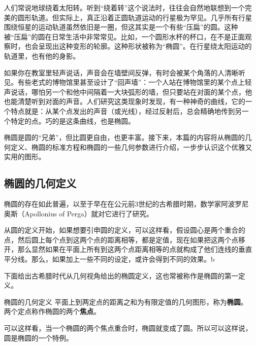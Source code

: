 
\begin{issues}
\issueDraft
\end{issues}


人们常说地球绕着太阳转。听到“绕着转”这个说法时，往往会自然地联想到一个完美的圆形轨道。但实际上，真正沿着正圆轨道运动的行星极为罕见。几乎所有行星围绕恒星的运动轨道虽然依旧是一圈，但这其实是一个有些“压扁”的圆。这种被“压扁”的圆在日常生活中非常常见。比如，一个圆形水杯的杯口，在不是正面观察时，也会呈现出这种变形的轮廓。这种形状被称为“椭圆”。在行星绕太阳运动的轨道里，也有他的身影。

如果你在教室里轻声说话，声音会在墙壁间反弹，有时会被某个角落的人清晰听见。有些老式的博物馆里甚至设计了“回声墙”：一个人站在博物馆里的某个点上轻声说话，哪怕另一个和他中间隔着一大块弧形的墙，但只要站在对面的某个点，他也能清楚听到对面的声音。人们研究这类现象时发现，有一种神奇的曲线，它的一个特点就是：从某个点发出的声音（或光线），经过反射后，总会精确地传到另一个特定的点。巧的是这条曲线，也是椭圆。

椭圆是圆的“兄弟”，但比圆更自由，也更丰富。接下来，本篇的内容将从椭圆的几何定义、椭圆的标准方程和椭圆的一些几何参数进行介绍，一步步认识这个优雅又实用的图形。

\subsection{椭圆的几何定义}

椭圆的存在如此普遍，以至于早在在公元前3世纪的古希腊时期，数学家阿波罗尼奥斯（Apollonius of Perga）就对它进行了研究。

从圆的定义开始，如果想要引申圆的定义，可以这样看，假设圆心是两个重合的点，然后圆上每个点到这两个点的距离相等，都是定值，现在如果把这两个点移开，那么显然如果在平面上所有到这两个点距离相等的点就构成了他们连线的垂直平分线。那么，如果加上一些不同的设定，或许会得到不同的效果。b

下面给出古希腊时代从几何视角给出的椭圆定义，这也常被称作是椭圆的第一定义。

\begin{definition}{椭圆的几何定义}
平面上到两定点的距离之和为有限定值的几何图形，称为\textbf{椭圆}。两个定点称作椭圆的两个\textbf{焦点}。
\end{definition}

可以这样看，当一个椭圆的两个焦点重合时，椭圆就变成了圆。所以可以这样说，圆是椭圆的一个特例。

